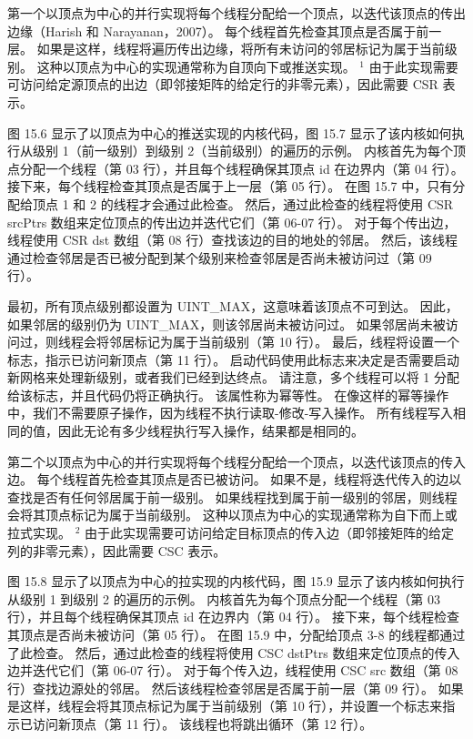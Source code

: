 第一个以顶点为中心的并行实现将每个线程分配给一个顶点，以迭代该顶点的传出边缘（Harish 和 Narayanan，2007）。 每个线程首先检查其顶点是否属于前一层。 如果是这样，线程将遍历传出边缘，将所有未访问的邻居标记为属于当前级别。 这种以顶点为中心的实现通常称为自顶向下或推送实现。 ${ }^{1}$ 由于此实现需要可访问给定源顶点的出边（即邻接矩阵的给定行的非零元素），因此需要 CSR 表示。

图 15.6 显示了以顶点为中心的推送实现的内核代码，图 15.7 显示了该内核如何执行从级别 1（前一级别）到级别 2（当前级别）的遍历的示例。 内核首先为每个顶点分配一个线程（第 03 行），并且每个线程确保其顶点 id 在边界内（第 04 行）。 接下来，每个线程检查其顶点是否属于上一层（第 05 行）。 在图 15.7 中，只有分配给顶点 1 和 2 的线程才会通过此检查。 然后，通过此检查的线程将使用 CSR srcPtrs 数组来定位顶点的传出边并迭代它们（第 06-07 行）。 对于每个传出边，线程使用 CSR dst 数组（第 08 行）查找该边的目的地处的邻居。 然后，该线程通过检查邻居是否已被分配到某个级别来检查邻居是否尚未被访问过（第 09 行）。

最初，所有顶点级别都设置为 UINT\_MAX，这意味着该顶点不可到达。 因此，如果邻居的级别仍为 UINT\_MAX，则该邻居尚未被访问过。 如果邻居尚未被访问过，则线程会将邻居标记为属于当前级别（第 10 行）。 最后，线程将设置一个标志，指示已访问新顶点（第 11 行）。 启动代码使用此标志来决定是否需要启动新网格来处理新级别，或者我们已经到达终点。 请注意，多个线程可以将 1 分配给该标志，并且代码仍将正确执行。 该属性称为幂等性。 在像这样的幂等操作中，我们不需要原子操作，因为线程不执行读取-修改-写入操作。 所有线程写入相同的值，因此无论有多少线程执行写入操作，结果都是相同的。

第二个以顶点为中心的并行实现将每个线程分配给一个顶点，以迭代该顶点的传入边。 每个线程首先检查其顶点是否已被访问。 如果不是，线程将迭代传入的边以查找是否有任何邻居属于前一级别。 如果线程找到属于前一级别的邻居，则线程会将其顶点标记为属于当前级别。 这种以顶点为中心的实现通常称为自下而上或拉式实现。 ${ }^{2}$ 由于此实现需要可访问给定目标顶点的传入边（即邻接矩阵的给定列的非零元素），因此需要 CSC 表示。

图 15.8 显示了以顶点为中心的拉实现的内核代码，图 15.9 显示了该内核如何执行从级别 1 到级别 2 的遍历的示例。 内核首先为每个顶点分配一个线程（第 03 行），并且每个线程确保其顶点 id 在边界内（第 04 行）。 接下来，每个线程检查其顶点是否尚未被访问（第 05 行）。 在图 15.9 中，分配给顶点 3-8 的线程都通过了此检查。 然后，通过此检查的线程将使用 CSC dstPtrs 数组来定位顶点的传入边并迭代它们（第 06-07 行）。 对于每个传入边，线程使用 CSC src 数组（第 08 行）查找边源处的邻居。 然后该线程检查邻居是否属于前一层（第 09 行）。 如果是这样，线程会将其顶点标记为属于当前级别（第 10 行），并设置一个标志来指示已访问新顶点（第 11 行）。 该线程也将跳出循环（第 12 行）。


